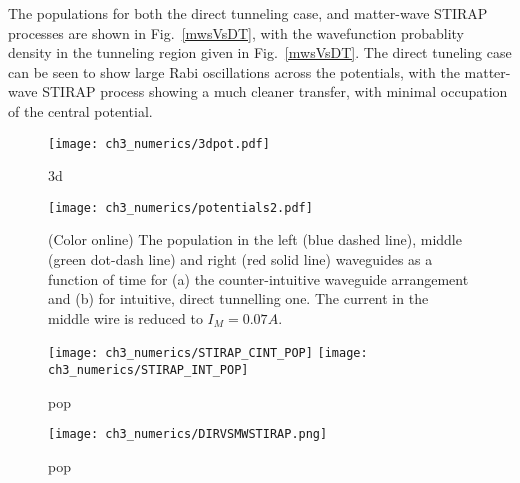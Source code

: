 The populations for both the direct tunneling case, and matter-wave STIRAP processes are shown in Fig.~\ref{mwsVsDT}, with the wavefunction probablity density in the tunneling region given in Fig.~\ref{mwsVsDT}. The direct tuneling case can be seen to show large Rabi oscillations across the potentials, with the matter-wave STIRAP process showing a much cleaner transfer, with minimal occupation of the central potential.

\begin{figure}[tb]
    \centering
  \texttt{[image: ch3\_numerics/3dpot.pdf]}
  \caption{3d}
  \label{fig:Populations}
\end{figure}

\begin{figure}[tb]
    \centering
  \texttt{[image: ch3\_numerics/potentials2.pdf]}
  \caption{(Color online) The population in the left (blue dashed line), middle (green dot-dash line) and right (red solid line) waveguides as a function of time for (a) the counter-intuitive waveguide arrangement and (b) for intuitive, direct tunnelling one. The current in the middle wire is reduced to $I_M=0.07 A$.}
  \label{fig:Populations}
\end{figure}

\begin{figure}[tb]
    \centering
  \texttt{[image: ch3\_numerics/STIRAP\_CINT\_POP]}
  \texttt{[image: ch3\_numerics/STIRAP\_INT\_POP]}
  \caption{pop}
  \label{fig:Populations}
\end{figure}

\begin{figure}[tb]
    \centering
  \texttt{[image: ch3\_numerics/DIRVSMWSTIRAP.png]}
  \caption{pop}
  \label{fig:Populations}
\end{figure}
